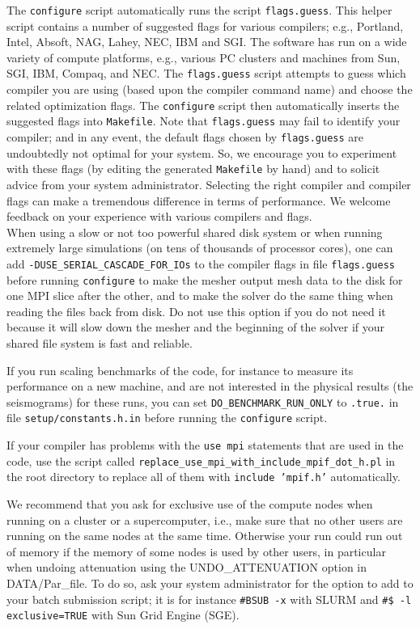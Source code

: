 The \texttt{configure} script automatically runs the script \texttt{flags.guess}.
This helper script contains a number of suggested flags for various
compilers; e.g., Portland, Intel, Absoft, NAG, Lahey, NEC, IBM and
SGI. The software has run on a wide variety of compute platforms,
e.g., various PC clusters and machines from Sun, SGI, IBM, Compaq,
and NEC. The \texttt{flags.guess} script attempts to guess which compiler
you are using (based upon the compiler command name) and choose the
related optimization flags. The \texttt{configure} script then automatically
inserts the suggested flags into \texttt{Makefile}. Note that \texttt{flags.guess}
may fail to identify your compiler; and in any event, the default
flags chosen by \texttt{flags.guess} are undoubtedly not optimal for
your system. So, we encourage you to experiment with these flags (by
editing the generated \texttt{Makefile} by hand) and to solicit advice
from your system administrator. Selecting the right compiler and compiler
flags can make a tremendous difference in terms of performance. We
welcome feedback on your experience with various compilers and flags.\\

When using a slow or not too powerful shared disk system or when running extremely large simulations
(on tens of thousands of processor cores), one can add \texttt{-DUSE\_SERIAL\_CASCADE\_FOR\_IOs} to the compiler flags
in file \texttt{flags.guess} before running \texttt{configure} to make the mesher output mesh data
to the disk for one MPI slice after the other, and to make the solver do the same thing when reading the files back from disk.
Do not use this option if you do not need it because it will slow down the mesher and the beginning of the solver if your
shared file system is fast and reliable.

If you run scaling benchmarks of the code, for instance to measure its performance on a new machine, and are not interested in the physical results
(the seismograms) for these runs, you can set \texttt{DO\_BENCHMARK\_RUN\_ONLY} to \texttt{.true.} in file \texttt{setup/constants.h.in} before running the \texttt{configure} script.

If your compiler has problems with the \texttt{use mpi} statements that are used in the code, use the script called
\texttt{replace\_use\_mpi\_with\_include\_mpif\_dot\_h.pl} in the root directory to replace all of them with \texttt{include 'mpif.h'} automatically.

We recommend that you ask for exclusive use of the compute nodes when running on a cluster or a supercomputer, i.e., make sure that no other users
are running on the same nodes at the same time. Otherwise your run could run out of memory if the memory of some nodes is used by other users, in particular
when undoing attenuation using the UNDO\_ATTENUATION option in DATA/Par\_file.
To do so, ask your system administrator for the option to add to your batch submission script; it is for instance
\texttt{\#BSUB -x} with SLURM and \texttt{\#\$ -l exclusive=TRUE} with Sun Grid Engine (SGE).


